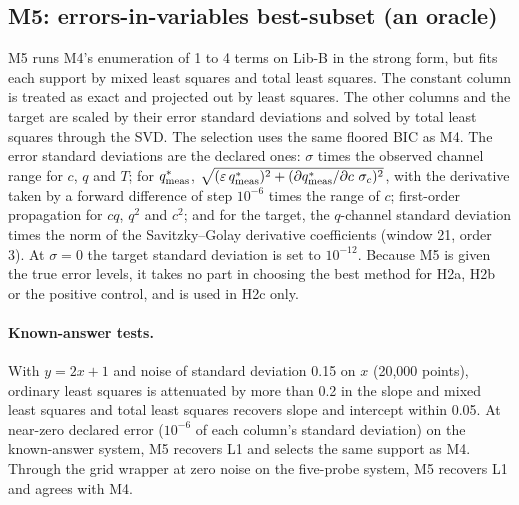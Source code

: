 \subsection*{M5: errors-in-variables best-subset (an oracle)}
M5 runs M4's enumeration of 1 to 4 terms on Lib-B in the strong form, but fits each support
by mixed least squares and total least squares. The constant column is treated as exact and
projected out by least squares. The other columns and the target are scaled by their error
standard deviations and solved by total least squares through the SVD. The selection uses
the same floored BIC as M4. The error standard deviations are the declared ones: $\sigma$
times the observed channel range for $c$, $q$ and $T$; for $q^{*}_{\mathrm{meas}}$,
$\sqrt{(\varepsilon\,q^{*}_{\mathrm{meas}})^2 + (\partial q^{*}_{\mathrm{meas}}/\partial c\ \sigma_c)^2}$, with the derivative
taken by a forward difference of step $10^{-6}$ times the range of $c$; first-order
propagation for $cq$, $q^2$ and $c^2$; and for the target, the $q$-channel standard
deviation times the norm of the Savitzky--Golay derivative coefficients (window 21, order 3).
At $\sigma = 0$ the target standard deviation is set to $10^{-12}$. Because M5 is given the
true error levels, it takes no part in choosing the best method for H2a, H2b or the positive
control, and is used in H2c only.

\paragraph{Known-answer tests.} With $y = 2x + 1$ and noise of standard deviation 0.15 on
$x$ (20,000 points), ordinary least squares is attenuated by more than 0.2 in the slope and
mixed least squares and total least squares recovers slope and intercept within 0.05. At
near-zero declared error ($10^{-6}$ of each column's standard deviation) on the known-answer
system, M5 recovers L1 and selects the same support as M4. Through the grid wrapper at zero
noise on the five-probe system, M5 recovers L1 and agrees with M4.

